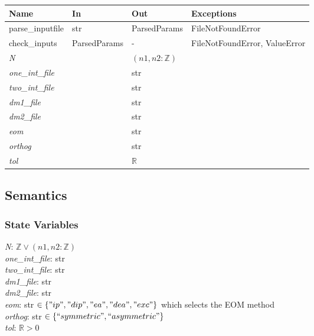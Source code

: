 \documentclass[12pt, titlepage]{article}
\begin{document}
\begin{center}
	\begin{tabular}{p{2.7cm} p{4cm} p{4cm} p{2cm}}
		\hline
		\textbf{Name} & \textbf{In} & \textbf{Out} & \textbf{Exceptions} \\
		\hline
		parse\_inputfile& str& ParsedParams & FileNotFoundError \\
		check\_inputs& ParsedParams& - & FileNotFoundError, ValueError \\
		\textit{N}& & $(n1, n2:\mathbb{Z})$ & \\
		\textit{one\_int\_file}& & str & \\
		\textit{two\_int\_file}& & str & \\
		\textit{dm1\_file}& & str & \\
		\textit{dm2\_file}& & str & \\
		\textit{eom}& & str & \\
		\textit{orthog}& & str & \\
		\textit{tol}& & $\mathbb{R}$ & \\
		\hline
	\end{tabular}
\end{center}

\subsection{Semantics}

\subsubsection{State Variables}

\textit{N}: $\mathbb{Z} \lor (n1, n2:\mathbb{Z})$\\
\textit{one\_int\_file}: str\\
\textit{two\_int\_file}: str\\
\textit{dm1\_file}: str\\
\textit{dm2\_file}: str\\
\textit{eom}: str $\in \{"ip", "dip", "ea", "dea", "exc"\}$ which selects the 
EOM method\\
\textit{orthog}: str $\in \{``symmetric", ``asymmetric"\}$\\
\textit{tol}: $\mathbb{R} > 0$\\
\end{document}
